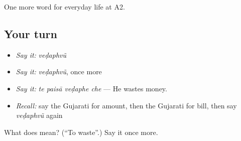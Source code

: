 \begin{grammarlens}[title={What you've built}]
One more word for everyday life at A2.
\end{grammarlens}

\subsection*{Your turn}
\begin{itemize}
\raggedright
  \item \emph{Say it:} \emph{veḍaphvũ}
  \item \emph{Say it:} \emph{veḍaphvũ}, once more
  \item \emph{Say it:} \emph{te paisā veḍaphe che} — He wastes money.
  \item \emph{Recall:} say the Gujarati for amount, then the Gujarati for bill, then say \emph{veḍaphvũ} again
\end{itemize}

\begin{tcolorbox}[breakable,colback=teal!4,colframe=teal!35!black,title={Before you move on}]
What does  mean? (\textquotedblleft{}To waste\textquotedblright{}.) Say it once more.
\end{tcolorbox}
